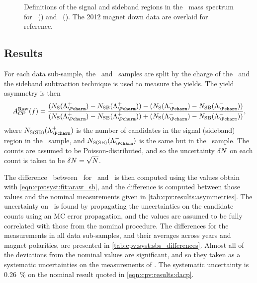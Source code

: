 \begin{figure}
\begin{subfigure}[b]{0.5\textwidth}
    \caption{\ppipi}
    \label{fig:cpv:syst:mass_windows:ppipi}
  \end{subfigure}
  \caption{%
    Definitions of the signal and sideband regions in the \PLambdac\ mass
    spectrum for \pKK~() and
    \ppipi~().
    The 2012 magnet down data are overlaid for reference.
  }
  \label{fig:cpv:syst:mass_windows}
\end{figure}

\subsection{Results}
\label{chap:cpv:syst:fit:results}

For each data sub-sample, the \pKK\ and \ppipi\ samples are split by the charge
of the \PLambdac\ and the sideband subtraction technique is used to measure the
yields.
The yield asymmetry is then
\begin{equation}
  \ARaw(f) = \frac{%
    (N_{\text{S}}(\PLambdac) - N_{\text{SB}}(\PLambdac)) -
    (N_{\text{S}}(\APLambdac) - N_{\text{SB}}(\APLambdac))
  }{%
    (N_{\text{S}}(\PLambdac) - N_{\text{SB}}(\PLambdac)) +
    (N_{\text{S}}(\APLambdac) - N_{\text{SB}}(\APLambdac))
  },
  \label{eqn:cpv:syst:fit:araw_sb}
\end{equation}
where $N_{\text{S(SB)}}(\PLambdac)$ is the number of candidates in the signal
(sideband) region in the \PLambdac\ sample, and $N_{\text{S(SB)}}(\APLambdac)$
is the same but in the \APLambdac\ sample.
The counts are assumed to be Poisson-distributed, and so the uncertainty
$\delta{N}$ on each count is taken to be $\delta{N} = \sqrt{N}$.

The difference \dACP\ between \ARaw\ for \pKK\ and \ppipi\ is then computed
using the values obtain with \cref{eqn:cpv:syst:fit:araw_sb}, and the
difference is computed between those values and the nominal measurements given
in \cref{tab:cpv:results:asymmetries}.
The uncertainty on \ARaw\ is found by propagating the uncertainties on the
candidate counts using an \ac{MC} error propagation, and the values are assumed
to be fully correlated with those from the nominal procedure.
The differences for the measurements in all data sub-samples, and their
averages across years and magnet polarities, are presented in
\cref{tab:cpv:syst:sbs_differences}.
Almost all of the deviations from the nominal values are significant, and so
they taken as a systematic uncertainties on the measurements of \dACP\@.
The systematic uncertainty is \SI{0.26}{\percent} on the nominal result quoted
in \cref{eqn:cpv:results:dacp}.

